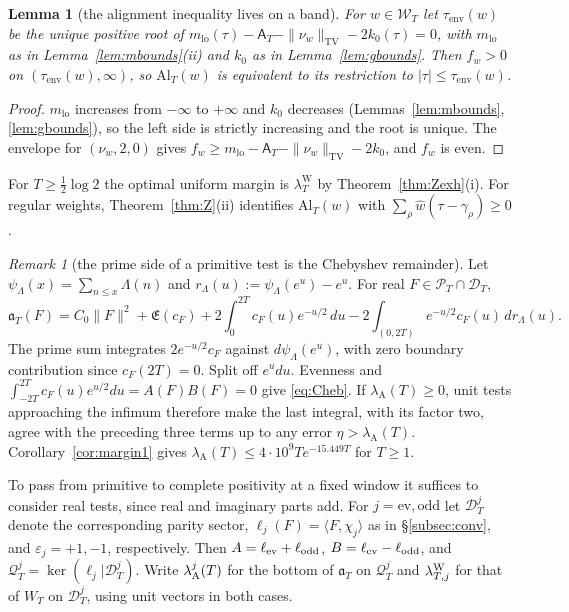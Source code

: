\documentclass[10pt]{amsart}
\newtheorem{lemma}[theorem]{Lemma}
\theoremstyle{definition}
\theoremstyle{remark}
\newtheorem{remark}[theorem]{Remark}
\newcommand{\TV}{\operatorname{TV}}
\newcommand{\PT}{\mathcal P_T}
\newcommand{\lamW}{\lambda^{\mathrm W}_T}
\newcommand{\lamA}{\lambda_{\mathrm A}(T)}
\newcommand{\wh}{\widehat w}
\newcommand{\cF}{c_F}
\newcommand{\Lev}{\mathfrak E}
\newcommand{\Wcl}{\mathcal W_T}
\newcommand{\Aconst}{\mathsf A_T}
\begin{document}
\begin{lemma}[the alignment inequality lives on a band]\label{lem:Alband}
For $w\in\Wcl$ let $\tau_{\mathrm{env}}(w)$ be the unique positive root of
$m_{\mathrm{lo}}(\tau)-\Aconst-\|\nu_w\|_{\TV}-2k_0(\tau)=0$, with $m_{\mathrm{lo}}$ as in Lemma~\ref{lem:mbounds}(ii)
and $k_0$ as in Lemma~\ref{lem:gbounds}. Then $f_w>0$ on $(\tau_{\mathrm{env}}(w),\infty)$, so $\mathrm{Al}_T(w)$ is
equivalent to its restriction to $|\tau|\le\tau_{\mathrm{env}}(w)$.
\end{lemma}
\begin{proof}
$m_{\mathrm{lo}}$ increases from $-\infty$ to $+\infty$ and $k_0$ decreases (Lemmas~\ref{lem:mbounds}, \ref{lem:gbounds}),
so the left side is strictly increasing and the root is unique. The envelope for $(\nu_w,2,0)$ gives $f_w\ge m_{\mathrm{lo}}-\Aconst-\|\nu_w\|_{\TV}-2k_0$, and $f_w$ is even.
\end{proof}

For $T\ge\frac12\log2$ the optimal uniform margin is $\lamW$
by Theorem~\ref{thm:Zexh}(i). For regular weights,
Theorem~\ref{thm:Z}(ii) identifies $\mathrm{Al}_T(w)$ with
$\sum_\rho\wh(\tau-\gamma_\rho)\ge0$.

\begin{remark}[the prime side of a primitive test is the Chebyshev remainder]\label{rem:Cheb}
Let $\psi_\Lambda(x)=\sum_{n\le x}\Lambda(n)$ and $r_\Lambda(u):=\psi_\Lambda(e^u)-e^u$. For real $F\in\PT\cap\mathcal D_T$,
\begin{equation}\label{eq:Cheb}
\mathfrak a_T(F)=C_0\|F\|^2+\Lev(\cF)+2\int_0^{2T}\cF(u)e^{-u/2}\,du-2\int_{(0,2T)}e^{-u/2}\cF(u)\,dr_\Lambda(u).
\end{equation}
The prime sum integrates $2e^{-u/2}\cF$ against $d\psi_\Lambda(e^u)$,
with zero boundary contribution since $\cF(2T)=0$. Split off $e^u du$.
Evenness and $\int_{-2T}^{2T}\cF(u)e^{u/2}du=A(F)B(F)=0$
give \eqref{eq:Cheb}. If $\lamA\ge0$, unit tests approaching the
infimum therefore make the last integral, with its factor two, agree
with the preceding three terms up to any error $\eta>\lamA$.
Corollary~\ref{cor:margin1} gives $\lamA\le4\cdot10^9Te^{-15.449T}$ for $T\ge1$.
\end{remark}

To pass from primitive to complete positivity at a fixed window it
suffices to consider real tests, since real and imaginary parts add.
For $j=\mathrm{ev},\mathrm{odd}$ let $\mathcal D_T^j$ denote the
corresponding parity sector, $\ell_j(F)=\langle F,\chi_j\rangle$
as in \S\ref{subsec:conv}, and $\varepsilon_j=+1,-1$, respectively.
Then $A=\ell_{\rm ev}+\ell_{\rm odd}$, $B=\ell_{\rm ev}-\ell_{\rm odd}$,
and $\mathcal Q_T^j=\ker(\ell_j|\mathcal D_T^j)$.
Write $\lambda_{\rm A}^j(T)$ for the bottom of $\mathfrak a_T$ on
$\mathcal Q_T^j$ and $\lambda^{\rm W}_{T,j}$ for that of $W_T$
on $\mathcal D_T^j$, using unit vectors in both cases.
\end{document}
